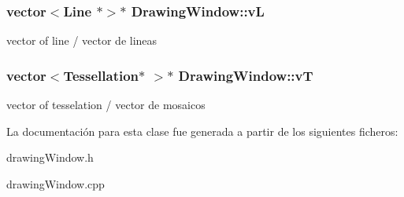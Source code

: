\subsubsection[{v\+L}]{\setlength{\rightskip}{0pt plus 5cm}vector$<${\bf Line} $\ast$$>$$\ast$ Drawing\+Window\+::v\+L\hspace{0.3cm}{\ttfamily [private]}}\label{class_drawing_window_a6e1effc34bb2f2c43becfd1df203b693}
vector of line / vector de lineas \hypertarget{class_drawing_window_a00c917f0910ac7b70729d6a48f0602ac}{}
\subsubsection[{v\+T}]{\setlength{\rightskip}{0pt plus 5cm}vector$<${\bf Tessellation}$\ast$ $>$$\ast$ Drawing\+Window\+::v\+T\hspace{0.3cm}{\ttfamily [private]}}\label{class_drawing_window_a00c917f0910ac7b70729d6a48f0602ac}
vector of tesselation / vector de mosaicos 

La documentación para esta clase fue generada a partir de los siguientes ficheros\+:\begin{DoxyCompactItemize}
\item 
drawing\+Window.\+h\item 
drawing\+Window.\+cpp\end{DoxyCompactItemize}
